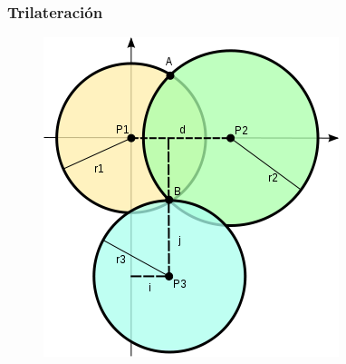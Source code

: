 \documentclass[mathserif]{beamer}
\begin{document}
\begin{frame}
\frametitle{Trilateración}

\begin{figure}
\includegraphics[width=.7\textheight]{../figures_chesta/estado_del_arte/trilateration}
\end{figure}

\end{frame}

\end{document}
